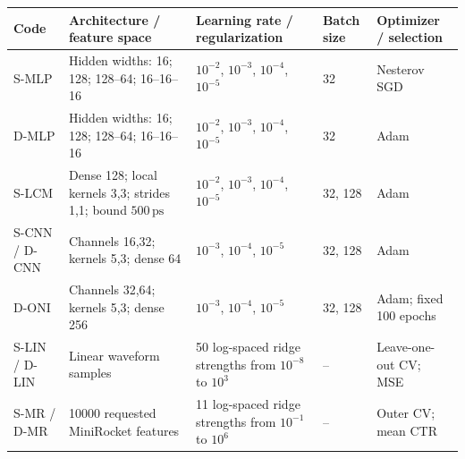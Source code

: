 \begin{strip}
\centering
\footnotesize
\setlength{\tabcolsep}{4pt}
\begin{tabular}{@{}p{}p{}p{}p{}p{}@{}}
\toprule
Code & Architecture / feature space & Learning rate / regularization & Batch size & Optimizer / selection \\
\midrule
S-MLP
& Hidden widths: 16; 128; 128--64; 16--16--16
& $10^{-2}$, $10^{-3}$, $10^{-4}$, $10^{-5}$
& 32
& Nesterov SGD \\

D-MLP
& Hidden widths: 16; 128; 128--64; 16--16--16
& $10^{-2}$, $10^{-3}$, $10^{-4}$, $10^{-5}$
& 32
& Adam \\

S-LCM
& Dense 128; local kernels 3,3; strides 1,1; bound $500\,\mathrm{ps}$
& $10^{-2}$, $10^{-3}$, $10^{-4}$, $10^{-5}$
& 32, 128
& Adam \\

S-CNN / D-CNN
& Channels 16,32; kernels 5,3; dense 64
& $10^{-3}$, $10^{-4}$, $10^{-5}$
& 32, 128
& Adam \\

D-ONI
& Channels 32,64; kernels 5,3; dense 256
& $10^{-3}$, $10^{-4}$, $10^{-5}$
& 32, 128
& Adam; fixed 100 epochs \\
\addlinespace[3pt]
\midrule
S-LIN / D-LIN
& Linear waveform samples
& 50 log-spaced ridge strengths from $10^{-8}$ to $10^{3}$
& --
& Leave-one-out CV; MSE \\

S-MR / D-MR
& 10000 requested MiniRocket features
& 11 log-spaced ridge strengths from $10^{-1}$ to $10^{6}$
& --
& Outer CV; mean CTR \\
\bottomrule
\end{tabular}
\label{tab:space-model-summary}
\end{strip}

